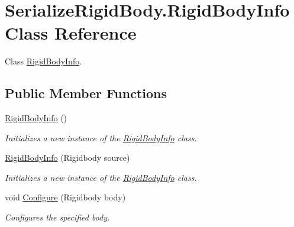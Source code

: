 \hypertarget{class_serialize_rigid_body_1_1_rigid_body_info}{}\section{Serialize\+Rigid\+Body.\+Rigid\+Body\+Info Class Reference}
\label{class_serialize_rigid_body_1_1_rigid_body_info}


Class \hyperlink{class_serialize_rigid_body_1_1_rigid_body_info}{Rigid\+Body\+Info}.  


\subsection*{Public Member Functions}
\begin{DoxyCompactItemize}
\item 
\hyperlink{class_serialize_rigid_body_1_1_rigid_body_info_a72e49914bb9032fe421733a06f545dd1}{Rigid\+Body\+Info} ()
\begin{DoxyCompactList}\small\item\em Initializes a new instance of the \hyperlink{class_serialize_rigid_body_1_1_rigid_body_info}{Rigid\+Body\+Info} class. \end{DoxyCompactList}\item 
\hyperlink{class_serialize_rigid_body_1_1_rigid_body_info_a01446d84b253e20edd369dd50bb4861d}{Rigid\+Body\+Info} (Rigidbody source)
\begin{DoxyCompactList}\small\item\em Initializes a new instance of the \hyperlink{class_serialize_rigid_body_1_1_rigid_body_info}{Rigid\+Body\+Info} class. \end{DoxyCompactList}\item 
void \hyperlink{class_serialize_rigid_body_1_1_rigid_body_info_aecc6136184351a86d80d18bdba75bf27}{Configure} (Rigidbody body)
\begin{DoxyCompactList}\small\item\em Configures the specified body. \end{DoxyCompactList}\end{DoxyCompactItemize}
